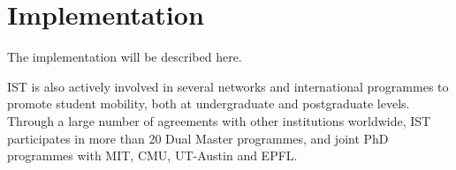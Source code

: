 \section{Implementation}
\label{sec:Implementation}


The implementation will be described here.

IST is also actively involved in several networks and international programmes to promote student mobility, both at undergraduate and postgraduate levels. Through a large number of agreements with other institutions worldwide, IST participates in more than 20 Dual Master programmes, and joint PhD programmes with MIT, CMU, UT-Austin and EPFL.


